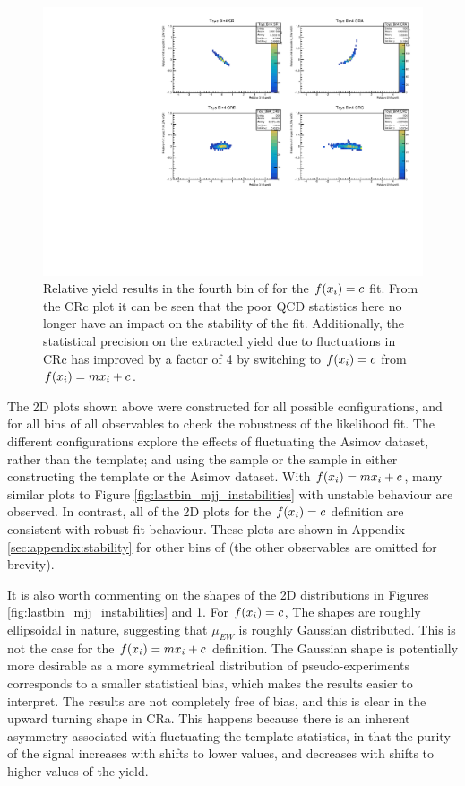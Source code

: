 \begin{figure}[t]
  \centering
  \includegraphics[width=\textwidth]{plots/diffx/instab/constfx/instabilities_mjj_QCD_Mgraph_Signal_Sh2211_BSMCQCDSTATS_madgraphasimov_bin4.pdf}
  \caption{Relative yield results in the fourth bin of \mjj for the $f(x_i)=c$ fit. From the CRc plot it can be seen that the poor QCD statistics here no longer have an impact on the stability of the fit. Additionally, the statistical precision on the extracted yield due to fluctuations in CRc has improved by a factor of 4 by switching to $f(x_i)=c$ from $f(x_i)=mx_i+c$. \label{fig:fxconstantinstab}}
\end{figure}

The 2D plots shown above were constructed for all possible configurations, and for all bins of all observables to check the robustness of the likelihood fit. The different configurations explore the effects of fluctuating the Asimov dataset, rather than the \qcdwy template; and using the \SHERPA sample or the \MADGRAPH sample in either constructing the \qcdwy template or the Asimov dataset. With $f(x_i)=mx_i+c$, many similar plots to Figure \ref{fig:lastbin_mjj_instabilities} with unstable behaviour are observed. In contrast, all of the 2D plots for the $f(x_i)=c$ definition are consistent with robust fit behaviour. These plots are shown in Appendix \ref{sec:appendix:stability} for other bins of \mjj (the other observables are omitted for brevity). 

It is also worth commenting on the shapes of the 2D distributions in Figures \ref{fig:lastbin_mjj_instabilities} and \ref{fig:fxconstantinstab}. For $f(x_i)=c$, The shapes are roughly ellipsoidal in nature, suggesting that $\mu_{EW}$ is roughly Gaussian distributed. This is not the case for the $f(x_i)=mx_i+c$ definition. The Gaussian shape is potentially more desirable as a more symmetrical distribution of pseudo-experiments corresponds to a smaller statistical bias, which makes the results easier to interpret. The results are not completely free of bias, and this is clear in the upward turning shape in CRa. This happens because there is an inherent asymmetry associated with fluctuating the \qcdwy template statistics, in that the purity of the signal increases with shifts to lower values, and decreases with shifts to higher values of the \qcdwy yield.

